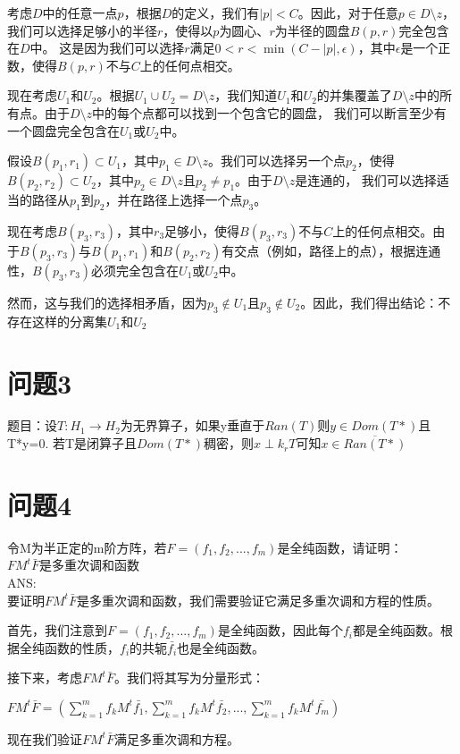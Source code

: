\documentclass[12pt, a4paper, oneside]{article}
\begin{document}
\begin{spacing}{2.0}
考虑$D$中的任意一点$p$，根据$D$的定义，我们有$|p| < C$。因此，对于任意$p \in D\setminus z$，我们可以选择足够小的半径$r$，使得以$p$为圆心、$r$为半径的圆盘$B(p, r)$完全包含在$D$中。
这是因为我们可以选择$r$满足$0 < r < \min(C - |p|, \epsilon)$，其中$\epsilon$是一个正数，使得$B(p, r)$不与$C$上的任何点相交。

现在考虑$U_1$和$U_2$。根据$U_1 \cup U_2 = D\setminus z$，我们知道$U_1$和$U_2$的并集覆盖了$D\setminus z$中的所有点。由于$D\setminus z$中的每个点都可以找到一个包含它的圆盘，
我们可以断言至少有一个圆盘完全包含在$U_1$或$U_2$中。

假设$B(p_1, r_1) \subset U_1$，其中$p_1 \in D\setminus z$。我们可以选择另一个点$p_2$，使得$B(p_2, r_2) \subset U_2$，其中$p_2 \in D\setminus z$且$p_2 \neq p_1$。由于$D\setminus z$是连通的，
我们可以选择适当的路径从$p_1$到$p_2$，并在路径上选择一个点$p_3$。

现在考虑$B(p_3, r_3)$，其中$r_3$足够小，使得$B(p_3, r_3)$不与$C$上的任何点相交。由于$B(p_3, r_3)$与$B(p_1, r_1)$和$B(p_2, r_2)$有交点（例如，路径上的点），根据连通性，$B(p_3, r_3)$必须完全包含在$U_1$或$U_2$中。

然而，这与我们的选择相矛盾，因为$p_3 \notin U_1$且$p_3 \notin U_2$。因此，我们得出结论：不存在这样的分离集$U_1$和$U_2$


\section{问题3}
题目：设$T:H_1\to H_2$为无界算子，如果y垂直于$Ran(T)$则$y\in Dom(T*)$且T*y=0. 若T是闭算子且$Dom(T*)$稠密，则$x\perp k_rT$可知$x\in \overline{Ran(T*)}$

\section{问题4}
令M为半正定的m阶方阵，若$F = (f_1, f_2, ... , f_m)$是全纯函数，请证明：\\
$FM ^t\bar{F}$是多重次调和函数
\\
ANS:\\
要证明$FM^t\bar{F}$是多重次调和函数，我们需要验证它满足多重次调和方程的性质。

首先，我们注意到$F = (f_1, f_2, ..., f_m)$是全纯函数，因此每个$f_i$都是全纯函数。根据全纯函数的性质，$f_i$的共轭$\bar{f_i}$也是全纯函数。

接下来，考虑$FM^t\bar{F}$。我们将其写为分量形式：

\begin{center}
    $FM^t\bar{F}=\left(\sum\limits_{k=1}^m f_kM^t\bar{f_1},\sum\limits_{k=1}^m f_kM^t\bar{f_2},...,\sum\limits_{k=1}^m f_kM^t\bar{f_m}\right)$
\end{center}
现在我们验证$FM^t\bar{F}$满足多重次调和方程。


\end{spacing}
\end{document}
